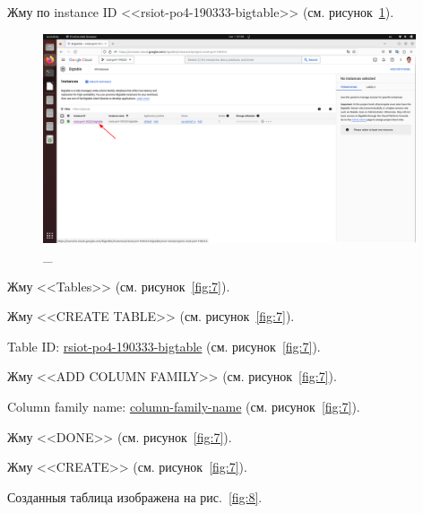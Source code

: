 \documentclass[12pt, a4paper, simple]{eskdtext}
\begin{document}
  Жму по instance ID <<rsiot-po4-190333-bigtable>> (см. рисунок~\ref{fig:6}).

  \begin{figure}[!h]
    \centering
    \includegraphics[width=11cm]
    {images/GoogleCloudBigTable/2023-03-01_07-00-22.png}
    \caption{\_}
    \label{fig:6}
  \end{figure}

  Жму <<Tables>> (см. рисунок~\ref{fig:7}).

  Жму <<CREATE TABLE>> (см. рисунок~\ref{fig:7}).

  Table ID: \underline{rsiot-po4-190333-bigtable} (см. рисунок~\ref{fig:7}).

  Жму <<ADD COLUMN FAMILY>> (см. рисунок~\ref{fig:7}).

  Column family name: \underline{column-family-name} (см. рисунок~\ref{fig:7}).

  Жму <<DONE>> (см. рисунок~\ref{fig:7}).

  Жму <<CREATE>> (см. рисунок~\ref{fig:7}).

  Созданныя таблица изображена на рис.~\ref{fig:8}.
\end{document}
